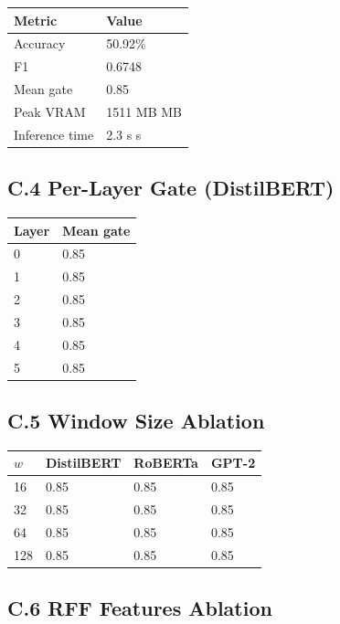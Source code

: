\begin{table}[H]
\centering
\small
\begin{tabular}{ll}
\toprule
\textbf{Metric} & \textbf{Value} \\
\midrule
Accuracy & 50.92\% \\
F1 & 0.6748 \\
Mean gate & 0.85 \\
Peak VRAM & 1511 MB MB \\
Inference time & 2.3 s s \\
\bottomrule
\end{tabular}
\end{table}

\subsection{C.4 Per-Layer Gate (DistilBERT)}

\begin{table}[H]
\centering
\small
\begin{tabular}{ll}
\toprule
\textbf{Layer} & \textbf{Mean gate} \\
\midrule
0 & 0.85 \\
1 & 0.85 \\
2 & 0.85 \\
3 & 0.85 \\
4 & 0.85 \\
5 & 0.85 \\
\bottomrule
\end{tabular}
\end{table}

\subsection{C.5 Window Size Ablation}

\begin{table}[H]
\centering
\small
\begin{tabular}{llll}
\toprule
\textbf{$w$} & \textbf{DistilBERT} & \textbf{RoBERTa} & \textbf{GPT-2} \\
\midrule
16 & 0.85 & 0.85 & 0.85 \\
32 & 0.85 & 0.85 & 0.85 \\
64 & 0.85 & 0.85 & 0.85 \\
128 & 0.85 & 0.85 & 0.85 \\
\bottomrule
\end{tabular}
\end{table}

\subsection{C.6 RFF Features Ablation}

